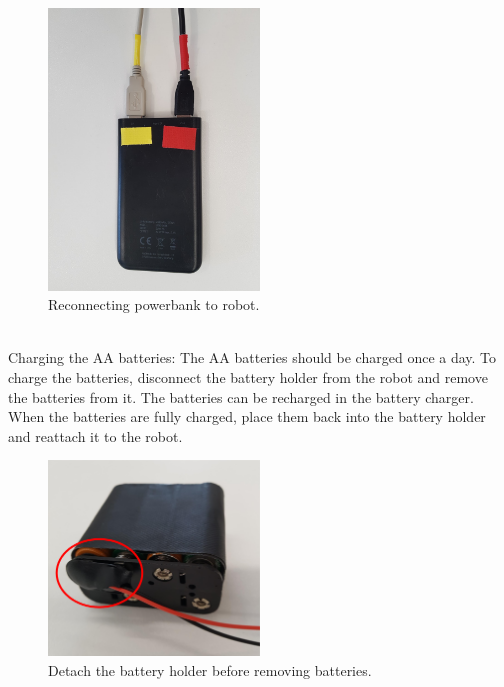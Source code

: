 \documentclass[onecolumn]{IEEEtran}
\begin{document}
\begin{figure}[H]
    \begin{center}
    \includegraphics[width=0.5\textwidth]{connect-pwrbnk.jpg}
    \caption{Reconnecting powerbank to robot.}
    \label{fig: figure}
    \end{center}
\end{figure}
\  \\
Charging the AA batteries:
\newline
The AA batteries should be charged once a day. To charge the batteries, disconnect the battery holder from the robot and remove the batteries from it. The batteries can be recharged in the battery charger. When the batteries are fully charged, place them back into the battery holder and reattach it to the robot.
\begin{figure}[H]
    \begin{center}
    \includegraphics[width=0.5\textwidth]{battery-detach.png}
    \caption{Detach the battery holder before removing batteries.}
    \label{fig: figure}
    \end{center}
\end{figure}
\end{document}
